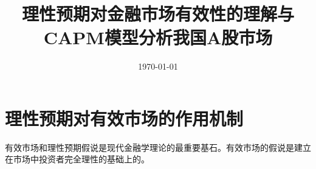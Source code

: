 \documentclass{xjtureport}
\title{理性预期对金融市场有效性的理解与CAPM模型分析我国A股市场}
\date{\today}
\begin{document}
\makecover
{}

\thispagestyle{fancy}

\rfoot{\thepage}
\tableofcontents
\clearpage


\section{理性预期对有效市场的作用机制}
有效市场和理性预期假说是现代金融学理论的最重要基石。有效市场的假说是建立在市场中投资者完全理性的基础上的。
\end{document}
